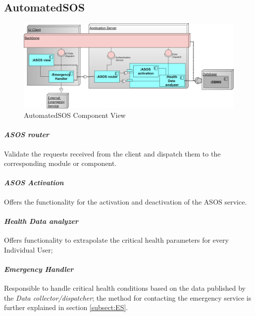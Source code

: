 \subsection{AutomatedSOS}
\label{subsect:ASOSComponentView}
\begin{figure}[H]
 \caption{AutomatedSOS Component View}
\centering
\includegraphics[width = \textwidth]{sections/architecturalDesign/ASOSDiagram.png}
\end{figure}
\paragraph{\textit{ASOS router}} Validate the requests received from the client and dispatch them to the corresponding module or component.
\paragraph{\textit{ASOS Activation}} Offers the functionality for the activation and deactivation of the ASOS service.
\paragraph{\textit{Health Data analyzer}} Offers functionality to extrapolate the critical health parameters for every Individual User;
\paragraph{\textit{Emergency Handler}} Responsible to handle critical health conditions based on the data published by the \textit{Data collector/dispatcher}; the method for contacting the emergency service is further explained in section \ref{subsect:ES}.
